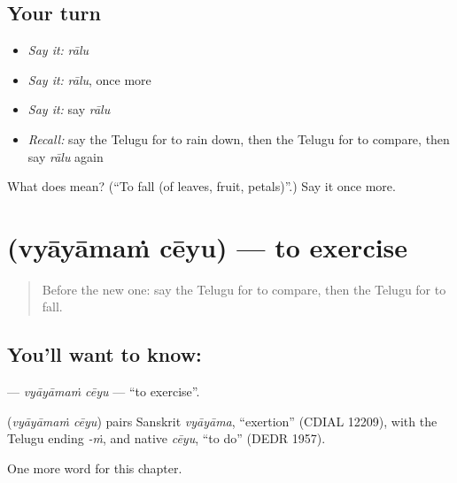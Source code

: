 \subsection*{Your turn}
\begin{itemize}
\raggedright
  \item \emph{Say it:} \emph{rālu}
  \item \emph{Say it:} \emph{rālu}, once more
  \item \emph{Say it:} say \emph{rālu}
  \item \emph{Recall:} say the Telugu for to rain down, then the Telugu for to compare, then say \emph{rālu} again
\end{itemize}

\begin{tcolorbox}[breakable,colback=teal!4,colframe=teal!35!black,title={Before you move on}]
What does  mean? (\textquotedblleft{}To fall (of leaves, fruit, petals)\textquotedblright{}.) Say it once more.
\end{tcolorbox}
\section[\texorpdfstring{\te{వ్యాయామం} \te{చేయు} (vyāyāmaṁ cēyu)}{వ్యాయామం చేయు (vyāyāmaṁ cēyu)}]{  (vyāyāmaṁ cēyu) — to exercise}

\label{lesson:TE-C204-vyayamam-ceyu}



\begin{quote}
Before the new one: say the Telugu for to compare, then the Telugu for to fall.
\end{quote}

\subsection*{You'll want to know:  }
\textbf{ } — \emph{vyāyāmaṁ cēyu} — \textquotedblleft{}to exercise\textquotedblright{}.

\begin{cousinweb}
\textbf{ } (\emph{vyāyāmaṁ cēyu}) pairs Sanskrit \emph{vyāyāma}, \textquotedblleft{}exertion\textquotedblright{} (CDIAL 12209), with the Telugu ending \emph{-ṁ}, and native \emph{cēyu}, \textquotedblleft{}to do\textquotedblright{} (DEDR 1957).
\end{cousinweb}

\begin{grammarlens}[title={What you've built}]
One more word for this chapter.
\end{grammarlens}

